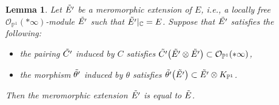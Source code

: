 \documentclass[pdftex]{sigma}
\numberwithin{equation}{section}
\newtheorem{Lemma}[Theorem]{Lemma}
\newcommand{\C}{\mathbb{C}}
\newcommand{\ps}{\mathbb{P}}
\newcommand{\strsheaf}{\mathcal{O}}
\begin{document}
\begin{Lemma}\label{mero_unique}
 Let $\Tilde{E'}$ be a meromorphic extension of $E$, i.e., a locally free $\strsheaf_{\ps^1}(*\infty)$-module $\Tilde{E'}$ such that $\Tilde{E'}|_{\C} = E$. Suppose that $\Tilde{E'}$ satisfies the following:
 \begin{itemize}\itemsep=0pt
 \item the pairing $\Tilde{C'}$ induced by $C$ satisfies $\Tilde{C'}\bigl(\Tilde{E'}\otimes \Tilde{E'}\bigr)\subset \strsheaf_{\ps^1}(*\infty)$,
 \item the morphism $\Tilde{\theta '}$ induced by $\theta$ satisfies $\Tilde{\theta'}\bigl(\Tilde{E'}\bigr)\subset \Tilde{E'}\otimes K_{\ps^1}$.
 \end{itemize}
 Then the meromorphic extension $\Tilde{E'}$ is equal to $\Tilde{E}$.
\end{Lemma}
\end{document}
